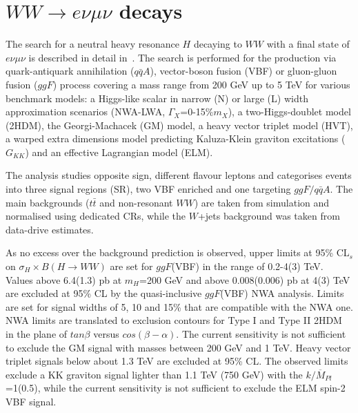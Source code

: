 \documentclass{PoS}
\begin{document}
\section{$WW\rightarrow e\nu \mu \nu$ decays}
\label{sec:WW}
The search for a neutral heavy resonance $H$ decaying to $WW$ with a final state of $e\nu \mu \nu$ is described in detail in~\cite{HIGG-2016-31}. 
The search is performed for the production via quark-antiquark annihilation ($q\bar{q}A$), vector-boson fusion (VBF) or gluon-gluon fusion ($ggF$) process covering a mass range from 200 GeV up to 5 TeV for various benchmark models: a Higgs-like scalar in narrow (N) or large (L) width approximation scenarios (NWA-LWA, $\Gamma_X$=0-15\%$m_X$), a two-Higgs-doublet model (2HDM), the Georgi-Machacek (GM) model, a heavy vector triplet model (HVT), a warped extra dimensions model predicting  Kaluza-Klein graviton excitations ($G_{KK}$) and an effective Lagrangian model (ELM).

The analysis studies opposite sign, different flavour leptons and categorises events into three signal regions (SR), two VBF enriched and one targeting $ggF/q\bar{q}A$. 
The main backgrounds ($t\bar{t}$ and non-resonant $WW$) are taken from simulation and normalised using dedicated CRs, while the $W$+jets background was taken from data-drive estimates.

As no excess over the background prediction is observed, upper limits at 95\% CL$_s$ on $\sigma_H \times B(H\rightarrow WW)$ are set for $ggF$(VBF) in the range of 0.2-4(3) TeV. 
Values above 6.4(1.3) pb at $m_H$=200 GeV and above 0.008(0.006) pb at 4(3) TeV are excluded at 95\% CL by the quasi-inclusive $ggF$(VBF) NWA analysis.
Limits are set for signal widths of 5, 10 and 15\% that are compatible with the NWA one.
NWA limits are translated to exclusion contours  for Type I and Type II 2HDM in the plane of $tan \beta$ versus $cos(\beta-\alpha)$.
The current sensitivity is not sufficient to exclude the GM signal with masses between 200 GeV and 1 TeV.
Heavy vector triplet signals below about 1.3 TeV are excluded at 95\% CL. 
The observed limits exclude a KK graviton signal lighter than 1.1 TeV (750 GeV) with the $k/\overline{M}_{Pl}$=1(0.5), while the current sensitivity is not sufficient to exclude the ELM spin-2 VBF signal. 
\end{document}
